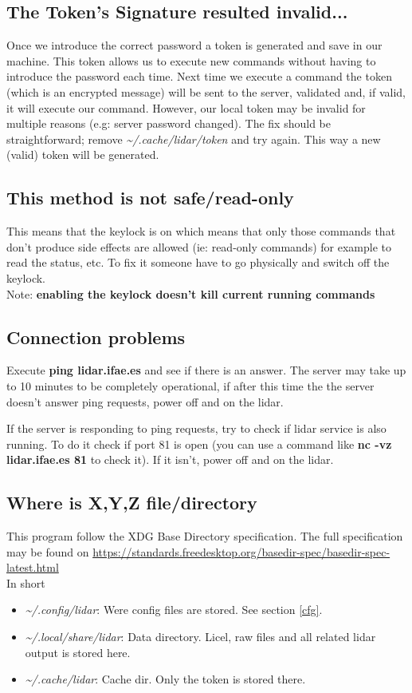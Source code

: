 \documentclass[letterpaper, 10 pt]{article}
\begin{document}
\subsection{The Token's Signature resulted invalid...}
Once we introduce the correct password a token is generated and save in our machine. This token allows us to execute new commands without having to introduce the password each time. Next time we execute a command the token (which is an encrypted message) will be sent to the server, validated and, if valid, it will execute our command. However, our local token may be invalid for multiple reasons (e.g: server password changed). The fix should be straightforward; remove \textit{\~{}/.cache/lidar/token} and try again. This way a new (valid) token will be generated.\\
\subsection{This method is not safe/read-only}
This means that the keylock is on which means that only those commands that don't produce side effects are allowed (ie: read-only commands) for example to read the status, etc. To fix it someone have to go physically and switch off the keylock.\\
Note: \textbf{enabling the keylock doesn't kill current running commands}
\subsection{Connection problems}
Execute \textbf{ping lidar.ifae.es} and see if there is an answer. The server may take up to 10 minutes to be completely operational, if after this time the the server doesn't answer ping requests, power off and on the lidar.

If the server is responding to ping requests, try to check if lidar service is also running. To do it check if port 81 is open (you can use a command like  \textbf{nc -vz lidar.ifae.es 81} to check it). If it isn't, power off and on the lidar.
\subsection{Where is X,Y,Z file/directory}
This program follow the XDG Base Directory specification. The full specification may be found on \url{https://standards.freedesktop.org/basedir-spec/basedir-spec-latest.html}\\
\linebreak
In short
\begin{itemize}
	\item \textit{ \~{}/.config/lidar}: Were config files are stored. See section \ref{cfg}.
	\item \textit{\~{}/.local/share/lidar}: Data directory. Licel, raw files and all related lidar output is stored here. 
	\item \textit{\~{}/.cache/lidar}: Cache dir. Only the token is stored there.
\end{itemize}

\newpage

%
\end{document}
